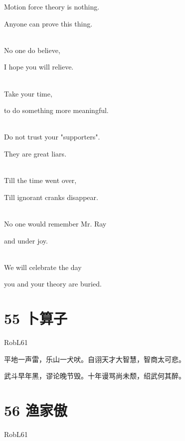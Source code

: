 \documentclass[UTF8,12pt,oneside]{ctexbook}
\begin{document}
        \begin{center}
        Motion force theory is nothing.
        
        Anyone can prove this thing.
        
        ~\\
        No one do believe,
        
        I hope you will relieve.
        
        ~\\
        Take your time,
        
        to do something more meaningful.
        
        ~\\
        Do not trust your "supporters".
        
        They are great liars.
        
        ~\\
        Till the time went over,
        
        Till ignorant cranks disappear.
        
        ~\\
        No one would remember Mr. Ray
        
        and under joy.
        
        ~\\
        We will celebrate the day
        
        you and your theory are buried.
        \end{center}
        
        \newpage
        
        \section{55 卜算子}
        \begin{center}
            RobL61
        \end{center}
        
        \begin{center}
            平地一声雷，乐山一犬吠。自诩天才大智慧，智商太可悲。
            
            武斗早年黑，谬论晚节毁。十年谩骂尚未颓，绍武何其醉。 
        \end{center}
        
        \section{56 渔家傲}
        \begin{center}
            RobL61
        \end{center}
        
\end{document}
